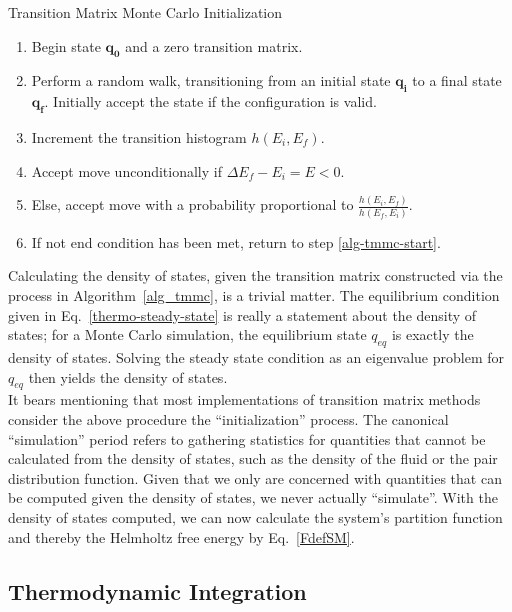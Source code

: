 \documentclass[12pt]{article}
\begin{document}
\begin{algorithm}[tb]
    \caption{Transition Matrix Monte Carlo Initialization}
    \label{alg_tmmc}
    \hrulefill
    \begin{enumerate}
        \item Begin state $\mathbf{q_0}$ and a zero transition matrix.
        \item Perform a random walk, transitioning from an initial state $\mathbf{q_i}$ to a final state $\mathbf{q_{f}}$. Initially accept the state if the configuration is valid. \label{alg-tmmc-start}
        \item Increment the transition histogram $h(E_i, E_f)$.
        \item Accept move unconditionally if $\Delta E_f - E_i = E < 0$.
        \item Else, accept move with a probability proportional to $\frac{h(E_i, E_f )}{h(E_f, E_i)}$.
        \item If not end condition has been met, return to step \ref{alg-tmmc-start}.   
    \end{enumerate}
    \hrulefill
\end{algorithm}

Calculating the density of states, given the transition matrix constructed via the process in Algorithm~\ref{alg_tmmc}, is a trivial matter. The equilibrium condition given in Eq.~\ref{thermo-steady-state} is really a statement about the density of states; for a Monte Carlo simulation, the equilibrium state $q_{eq}$ is exactly the density of states. Solving the steady state condition as an eigenvalue problem for $q_{eq}$ then yields the density of states\cite{perlinthesis}. \\

It bears mentioning that most implementations of transition matrix methods consider the above procedure the ``initialization'' process. The canonical ``simulation'' period refers to gathering statistics for quantities that cannot be calculated from the density of states, such as the density of the fluid or the pair distribution function. Given that we only are concerned with quantities that can be computed given the density of states, we never actually ``simulate''. With the density of states computed, we can now calculate the system's partition function and thereby the Helmholtz free energy by Eq.~\ref{FdefSM}.


\subsection{Thermodynamic Integration}
\end{document}
